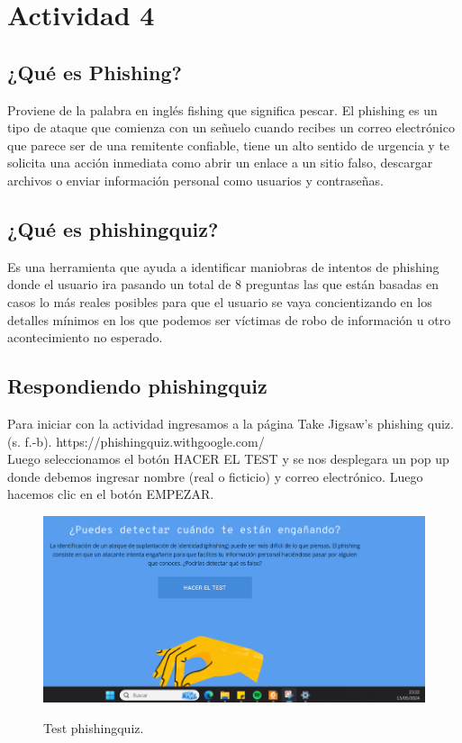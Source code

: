 \documentclass[stu, 11pt, letterpaper, donotrepeattitle, floatsintext, natbib]{apa7}
\begin{document}
\section{\large Actividad 4}

\subsection{¿Qué es Phishing?} 
Proviene de la palabra en inglés fishing que significa pescar. El phishing es un tipo de ataque que comienza con un señuelo cuando recibes un correo electrónico que parece ser de una remitente confiable, tiene un alto sentido de urgencia y te solicita una acción inmediata como abrir un enlace a un sitio falso, descargar archivos o enviar información personal como usuarios y contraseñas. 
\noindent {}\\

\subsection{¿Qué es phishingquiz?} 

Es una herramienta que ayuda a identificar maniobras de intentos de phishing donde el usuario ira pasando un total de 8 preguntas las que están basadas en casos lo más reales posibles para que el usuario se vaya concientizando en los detalles mínimos en los que podemos ser víctimas de robo de información u otro acontecimiento no esperado.

\subsection{Respondiendo phishingquiz} 

Para iniciar con la actividad ingresamos a la página Take Jigsaw’s phishing quiz. (s. f.-b). https://phishingquiz.withgoogle.com/  \noindent {}\\  Luego seleccionamos el botón HACER EL TEST y se nos desplegara un pop up donde debemos ingresar nombre (real o ficticio) y correo electrónico. Luego hacemos clic en el botón EMPEZAR.

\begin{figure}[H]
    \centering
    \caption{Test phishingquiz.}
    \includegraphics[width=0.75\linewidth]{phishing1.png} %
    \label{fig:OverallEffect}
\end{figure}
\end{document}
